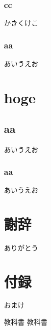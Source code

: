 \documentclass[11pt]{jsreport}
\begin{document}
\subsection{cc}
かきくけこ
\subsection{aa}
あいうえお

\chapter{hoge}
\section{aa}
あいうえお
\subsection{aa}
あいうえお

\chapter*{謝辞}
ありがとう

\appendix
\chapter{付録}
おまけ

\begin{thebibliography}{99}
   教科書
   教科書
\end{thebibliography}
\end{document}
